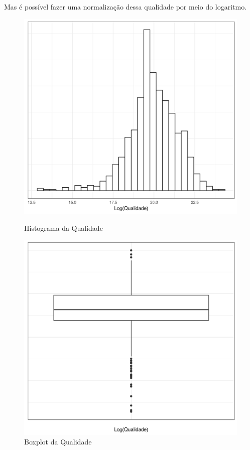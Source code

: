 \documentclass[]{article}
\begin{document}
	Mas é possível fazer uma normalização dessa qualidade por meio do logaritmo.
	
		\begin{figure}[H]
			\centering
			\begin{minipage}[b]{0.4\textwidth}
				\includegraphics[width=\textwidth]{imgs/histograma_log.png}
				\caption{Histograma da Qualidade}
			\end{minipage}
			\hfill
			\begin{minipage}[b]{0.4\textwidth}
				\includegraphics[width=\textwidth]{imgs/boxplot_log.png}
				\caption{Boxplot da Qualidade}
			\end{minipage}
		\end{figure}
		
\end{document}
